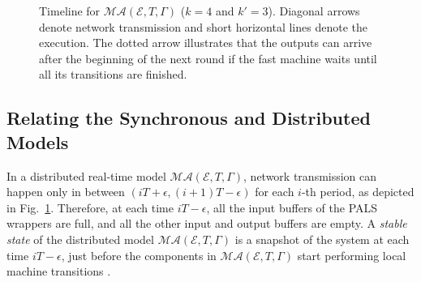 \begin{figure}
\begin{center}
\caption{Timeline for $\mathcal{MA}(\mathcal{E}, T, \Gamma)$ ($k=4$ and $k' = 3$).
Diagonal arrows denote network transmission and short horizontal lines denote the execution.
The dotted arrow illustrates that the outputs can arrive after the beginning of the next round 
if the fast machine waits until all its transitions are finished.
\label{fig:mr-timeline}}
\end{center}
\end{figure} 



\subsection{Relating the Synchronous and Distributed Models}

In a distributed real-time model $\mathcal{MA}(\mathcal{E}, T, \Gamma)$,
network transmission can happen only in between  $(iT+\epsilon, (i+1)T-\epsilon)$
for each $i$-th period, as depicted in Fig.~\ref{fig:mr-timeline}.
Therefore, at each time $iT - \epsilon$, all the input buffers of the PALS wrappers are full, 
and all the other input and output buffers are empty.
A \emph{stable state} of the distributed model $\mathcal{MA}(\mathcal{E}, T, \Gamma)$
is a snapshot of the system at each time $iT - \epsilon$,
just before the components in $\mathcal{MA}(\mathcal{E}, T, \Gamma)$ 
start performing local machine transitions \cite{pals-tcs}.



